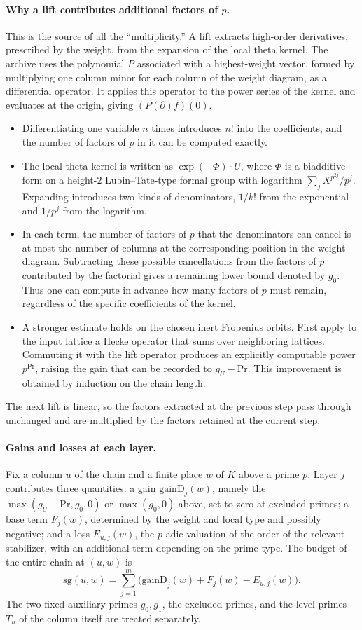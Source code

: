 \documentclass[11pt]{article}
\begin{document}
\paragraph{Why a lift contributes additional factors of $p$.} This is the source of all the ``multiplicity.'' A lift extracts high-order derivatives, prescribed by the weight, from the expansion of the local theta kernel. The archive uses the polynomial $P$ associated with a highest-weight vector, formed by multiplying one column minor for each column of the weight diagram, as a differential operator. It applies this operator to the power series of the kernel and evaluates at the origin, giving $(P(\partial)f)(0)$.
\begin{itemize}
\item Differentiating one variable $n$ times introduces $n!$ into the coefficients, and the number of factors of $p$ in it can be computed exactly.
\item The local theta kernel is written as $\exp(-\Phi)\cdot U$, where $\Phi$ is a biadditive form on a height-$2$ Lubin--Tate-type formal group with logarithm $\sum_j X^{p^{2j}}/p^j$. Expanding introduces two kinds of denominators, $1/k!$ from the exponential and $1/p^j$ from the logarithm.
\item In each term, the number of factors of $p$ that the denominators can cancel is at most the number of columns at the corresponding position in the weight diagram. Subtracting these possible cancellations from the factors of $p$ contributed by the factorial gives a remaining lower bound denoted by $g_0$. Thus one can compute in advance how many factors of $p$ must remain, regardless of the specific coefficients of the kernel.
\item A stronger estimate holds on the chosen inert Frobenius orbits. First apply to the input lattice a Hecke operator that sums over neighboring lattices. Commuting it with the lift operator produces an explicitly computable power $p^{\mathrm{Pr}}$, raising the gain that can be recorded to $g_U-\mathrm{Pr}$. This improvement is obtained by induction on the chain length.
\end{itemize}
The next lift is linear, so the factors extracted at the previous step pass through unchanged and are multiplied by the factors retained at the current step.

\paragraph{Gains and losses at each layer.} Fix a column $u$ of the chain and a finite place $w$ of $K$ above a prime $p$. Layer $j$ contributes three quantities: a gain $\mathrm{gainD}_j(w)$, namely the $\max(g_U-\mathrm{Pr},g_0,0)$ or $\max(g_0,0)$ above, set to zero at excluded primes; a base term $F_j(w)$, determined by the weight and local type and possibly negative; and a loss $E_{u,j}(w)$, the $p$-adic valuation of the order of the relevant stabilizer, with an additional term depending on the prime type. The budget of the entire chain at $(u,w)$ is
\[
\mathrm{sg}(u,w)=\sum_{j=1}^{m}\bigl(\mathrm{gainD}_j(w)+F_j(w)-E_{u,j}(w)\bigr).
\]
The two fixed auxiliary primes $g_0,g_1$, the excluded primes, and the level primes $T_u$ of the column itself are treated separately.
\end{document}
